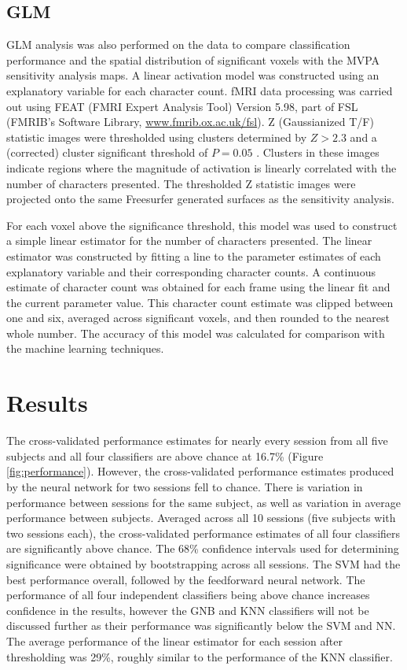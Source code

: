 \documentclass[5p,authoryear]{elsarticle}
\begin{document}
\subsection{GLM}
GLM analysis was also performed on the data to compare classification performance and the spatial distribution of significant voxels with the MVPA sensitivity analysis maps. 
A linear activation model was constructed using an explanatory variable for each character count.
fMRI data processing was carried out using FEAT (FMRI Expert Analysis Tool) Version 5.98, part of FSL (FMRIB's Software Library, \url{www.fmrib.ox.ac.uk/fsl}). 
Z (Gaussianized T/F) statistic images were thresholded using clusters determined by $Z > 2.3$ and a (corrected) cluster significant threshold of $P = 0.05$ \citep{Worsley2001}.
Clusters in these images indicate regions where the magnitude of activation is linearly correlated with the number of characters presented.
The thresholded Z statistic images were projected onto the same Freesurfer generated surfaces as the sensitivity analysis.

For each voxel above the significance threshold, this model was used to construct a simple linear estimator for the number of characters presented.
The linear estimator was constructed by fitting a line to the parameter estimates of each explanatory variable and their corresponding character counts.
A continuous estimate of character count was obtained for each frame using the linear fit and the current parameter value.
This character count estimate was clipped between one and six, averaged across significant voxels, and then rounded to the nearest whole number.
The accuracy of this model was calculated for comparison with the machine learning techniques.

\section{Results}
The cross-validated performance estimates for nearly every session from all five subjects and all four classifiers are above chance at 16.7\% (Figure \ref{fig:performance}).
However, the cross-validated performance estimates produced by the neural network for two sessions fell to chance.
There is variation in performance between sessions for the same subject, as well as variation in average performance between subjects.
Averaged across all 10 sessions (five subjects with two sessions each), the cross-validated performance estimates of all four classifiers are significantly above chance.
The 68\% confidence intervals used for determining significance were obtained by bootstrapping across all sessions.
The SVM had the best performance overall, followed by the feedforward neural network.
The performance of all four independent classifiers being above chance increases confidence in the results, however the GNB and KNN classifiers will not be discussed further as their performance was significantly below the SVM and NN.
The average performance of the linear estimator for each session after thresholding was 29\%, roughly similar to the performance of the KNN classifier.
\end{document}

